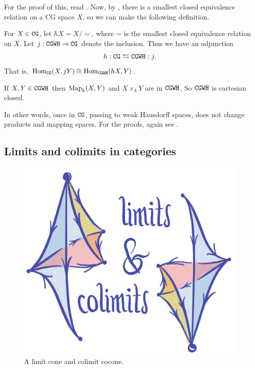 \documentclass{article}[11pt]
\begin{document}
For the proof of this, read \cite[Corollary 2.21]{Strickland-cgwh}. Now, by \cite[Proposition 2.22]{Strickland-cgwh}, there is a smallest closed equivalence relation on a CG space $X$, so we can make the following definition.

\begin{definition} For $X\in \texttt{CG}$, let $hX = X\Big/\sim$, where $\sim$ is the smallest closed equivalence relation on $X$. Let $j: \texttt{CGWH} \to \texttt{CG}$ denote the inclusion. Thus we have an adjunction
\begin{align*}
	h : \texttt{CG} \leftrightarrows \texttt{CGWH}: j.
\end{align*}
That is, $\textup{Hom}_{\texttt{CG}} (X, jY) \cong \textup{Hom}_{\texttt{CGWH}} (hX,Y)$. %
\end{definition}

\begin{proposition} If $X,Y\in \texttt{CGWH}$ then $\textup{Map}_k (X, Y)$ and $X\times_k Y$ are in $\texttt{CGWH}$. So $\texttt{CGWH}$ is cartesian closed.
\end{proposition}

In other words, once in $\texttt{CG}$, passing to weak Hausdorff spaces, does not change products and mapping spaces. For the proofs, again see \cite[Corollary 2.16 and Proposition 2.24]{Strickland-cgwh}.

\subsection{Limits and colimits in categories}

\begin{figure}[h]
  \includegraphics[scale=.1]{pics/limits.png}
  \centering
  \caption{A limit cone and colimit cocone.}
  \label{fig:lim}
\end{figure}
\end{document}
